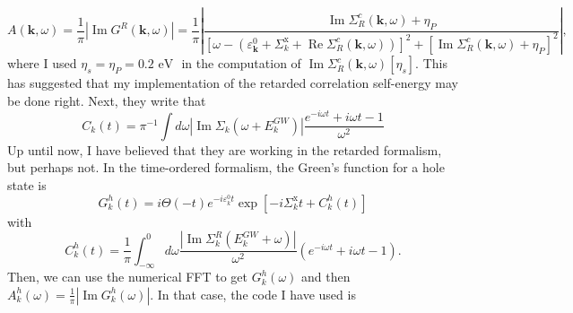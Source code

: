 \begin{equation}
    A(\mathbf{k}, \omega) = \frac{1}{\pi}|\operatorname{Im}G^R(\mathbf{k}, \omega)| =
\frac{1}{\pi} |\frac{ \operatorname{Im} \Sigma^c_R(\mathbf{k}, \omega)+\eta_P}{\left[\omega - \left(\varepsilon_{\mathbf{k}}^0+\Sigma_k^{\mathrm{x}}+ \operatorname{Re} \Sigma^c_R(\mathbf{k}, \omega)\right)\right]^2 + \left[\operatorname{Im} \Sigma^c_R(\mathbf{k}, \omega)+\eta_P\right]^2}|,
\end{equation}
where I used $\eta_s=\eta_P=0.2 \text{ eV }$ in the computation of $\operatorname{Im} \Sigma^c_R(\mathbf{k}, \omega)[\eta_s]$. This has suggested that my implementation of the retarded correlation self-energy may be done right. 
Next, they write that
\begin{equation}
    C_k(t) = \pi^{-1} \int d \omega\left|\operatorname{Im} \Sigma_k\left(\omega+E_k^{G W}\right)\right|\frac{e^{-i \omega t}+i \omega t-1}{\omega^2}
\end{equation}
Up until now, I have believed that they are working in the retarded formalism, but perhaps not. In the time-ordered formalism, the Green's function for a hole state is
\begin{equation}
    G^h_k(t) = i\Theta(-t) e^{-i \varepsilon^0_k t} \exp \left[-i \Sigma_k^{\mathrm{x}} t+C_k^h(t)\right]
\end{equation}
with
\begin{equation}
    C_k^h(t)=\frac{1}{\pi} \int_{-\infty}^0 d \omega \frac{\left|\operatorname{Im} \Sigma_k^R\left(E_k^{G W}+\omega\right)\right|}{\omega^2}\left(e^{-i \omega t}+i \omega t-1\right).
\end{equation}
Then, we can use the numerical FFT to get $G^h_k(\omega)$ and then $A^h_k(\omega) = \frac{1}{\pi} |\operatorname{Im} G^h_k(\omega)|$. In that case, the code I have used is 
